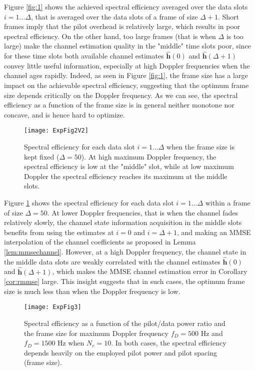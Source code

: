 \documentclass[conference, a4paper, 10pt]{IEEEtran}
\newcommand{\mx}[1]{\mathbf{#1}}
\begin{document}
Figure \ref{fig:1} shows the achieved spectral efficiency averaged over the data slots $i=1\dots\Delta$,
that is averaged over the data slots of a frame of size $\Delta+1$.
Short frames imply that the pilot overhead
is relatively large, which results in poor spectral efficiency.
On the other hand, too large frames (that is when $\Delta$
is too large) make the channel estimation quality in the "middle" time slots poor, since for these time slots both
available channel estimates $\mx{\hat h}(0)$ and $\mx{\hat h}(\Delta+1)$ convey little useful information, especially
at high Doppler frequencies when the channel ages rapidly.
Indeed, as seen in Figure \ref{fig:1}, the frame size
has a large impact on the achievable spectral efficiency, suggesting that the optimum frame size depends critically on
the Doppler frequency.
As we can see, the spectral efficiency as a function of the frame size is in general neither monotone nor concave,
and is hence hard to optimize.

\begin{figure}[t]
\begin{center}
\texttt{[image: ExpFig2V2]}
\caption{
Spectral efficiency for each data slot $i=1 \dots \Delta$ when the frame size is kept fixed ($\Delta=50$).
At high maximum Doppler frequency, the spectral efficiency is low at the "middle" slot,
while at low maximum Doppler the spectral efficiency reaches its maximum at the middle slots.
}
\label{fig:2}
\end{center}
\end{figure}

Figure \ref{fig:2} shows the spectral efficiency for
each data slot $i=1 \dots \Delta$ within a frame of size $\Delta=50$.
At lower Doppler frequencies, that is when the channel fades relatively slowly,
the channel state information acquisition in the middle slots benefits from using the estimates at $i=0$ and $i=\Delta+1$,
and making an \ac{MMSE} interpolation of the channel coefficients as proposed in Lemma \ref{lem:mmsechannel}.	
However, at a high Doppler frequency, the channel state in the middle data slots are weakly
correlated with the channel estimates $\mx{\hat h}(0)$ and $\mx{\hat h}(\Delta+1)$,
which makes the \ac{MMSE} channel estimation error in Corollary \ref{cor:rmmse} large.
This insight suggests that in such cases, the optimum frame size
is much less than when the Doppler frequency is low.

\begin{figure}[t]
\begin{center}
\texttt{[image: ExpFig3]}
\caption{
Spectral efficiency as a function of the pilot/data power ratio and the frame size
for maximum Doppler frequency $f_D=500$ Hz and $f_D=1500$ Hz when $N_r=10$.
In both cases, the spectral efficiency depends heavily on the employed pilot power
and pilot spacing (frame size).
}
\label{fig:3}
\end{center}
\end{figure}
\end{document}
